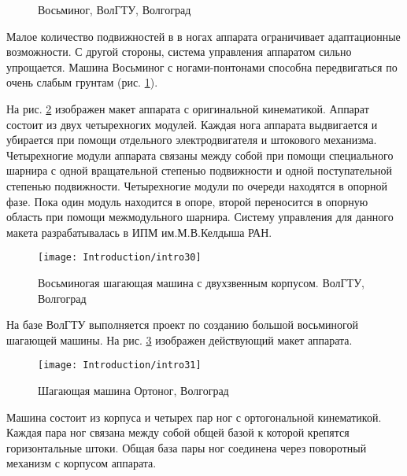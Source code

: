 \begin{figure}[ht]
	\begin{minipage}[ht]{0.49\linewidth}
	\end{minipage}
	\hfill
	\begin{minipage}[ht]{0.49\linewidth}
	\end{minipage}
	\caption{Восьминог, ВолГТУ, Волгоград}
	\label{img:octonog}
\end{figure}

Малое количество подвижностей в в ногах аппарата ограничивает адаптационные возможности. С другой стороны, система управления аппаратом сильно упрощается. Машина Восьминог с ногами-понтонами способна передвигаться по очень слабым грунтам (рис. \ref{img:octonog}).

На рис. \ref{img:ortho} изображен макет аппарата с оригинальной кинематикой. Аппарат состоит из двух четырехногих модулей. Каждая нога аппарата выдвигается и убирается при помощи отдельного электродвигателя и штокового механизма. Четырехногие модули аппарата связаны между собой при помощи специального шарнира с одной вращательной степенью подвижности и одной поступательной степенью подвижности. Четырехногие модули по очереди находятся в опорной фазе. Пока один модуль находится в опоре, второй переносится в опорную область при помощи межмодульного шарнира. Систему управления для данного макета разрабатывалась в ИПМ им.М.В.Келдыша РАН.

\begin{figure}[ht]
	\centering
	\texttt{[image: Introduction/intro30]}
	\caption{Восьминогая шагающая машина с двухзвенным корпусом. ВолГТУ, Волгоград}
	\label{img:ortho}
\end{figure}

На базе ВолГТУ выполняется проект по созданию большой восьминогой шагающей машины. На рис. \ref{img:ortho2} изображен действующий макет аппарата.

\begin{figure}[ht]
	\centering
	\texttt{[image: Introduction/intro31]}
	\caption{Шагающая машина Ортоног, Волгоград}
	\label{img:ortho2}
\end{figure}

Машина состоит из корпуса и четырех пар ног с ортогональной кинематикой. Каждая пара ног связана между собой общей базой к которой крепятся горизонтальные штоки. Общая база пары ног соединена через поворотный механизм с корпусом аппарата.